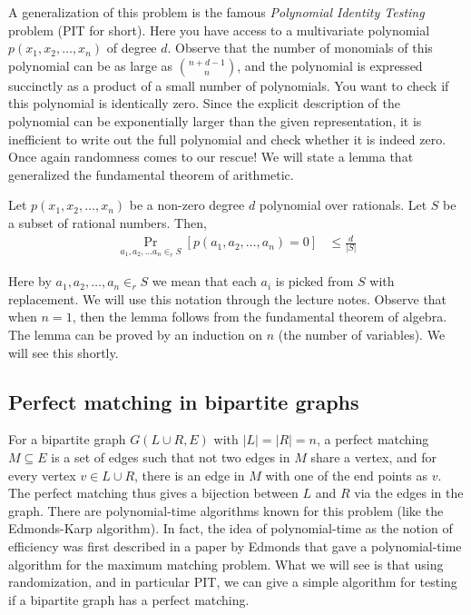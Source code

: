 A generalization of this problem is the famous \textit{Polynomial Identity Testing} problem (PIT for short). Here you have access to a multivariate polynomial $p(x_1, x_2, \ldots, x_n)$ of degree $d$. Observe that the number of monomials of this polynomial can be as large as $\binom{n+d-1}{n}$, and the polynomial is expressed succinctly as a product of a small number of polynomials. You want to check if this polynomial is identically zero. Since the explicit description of the polynomial can be exponentially larger than the given representation, it is inefficient to write out the full polynomial and check whether it is indeed zero. Once again randomness comes to our rescue! We will state a lemma that generalized the fundamental theorem of arithmetic.

\begin{lemma}
	Let $p(x_1, x_2, \ldots, x_n)$ be a non-zero degree $d$ polynomial over rationals. Let $S$ be a subset of rational numbers. Then,
	\begin{align*}
		\Pr_{a_1, a_2, \ldots a_n \in_r S} \left[ p(a_1, a_2, \ldots, a_n) = 0  \right] &\leq \frac{d}{|S|}
	\end{align*} 
	\label{lem:dlsz}
\end{lemma}

Here by ${a_1, a_2, \ldots, a_n \in_r S}$ we mean that each $a_i$ is picked from $S$ with replacement. We will use this notation through the lecture notes. Observe that when $n=1$, then the lemma follows from the fundamental theorem of algebra. The lemma can be proved by an induction on $n$ (the number of variables). We will see this shortly.

\subsection{Perfect matching in bipartite graphs}

For a bipartite graph $G(L\cup R,E)$ with $|L| = |R| = n$, a perfect matching
$M\subseteq E$ is a set of edges such that not two edges in $M$ share a vertex,
and for every vertex $v \in L\cup R$, there is an edge in $M$ with one of the
end points as $v$. The perfect matching thus gives a bijection between $L$ and
$R$ via the edges in the graph. There are polynomial-time algorithms known for
this problem (like the Edmonds-Karp algorithm). In fact, the idea of
polynomial-time as the notion of efficiency was first described in a paper by
Edmonds that gave a polynomial-time algorithm for the maximum matching
problem. What we will see is that using
randomization, and in particular PIT, we can give a simple algorithm for testing
if a bipartite graph has a perfect matching.

